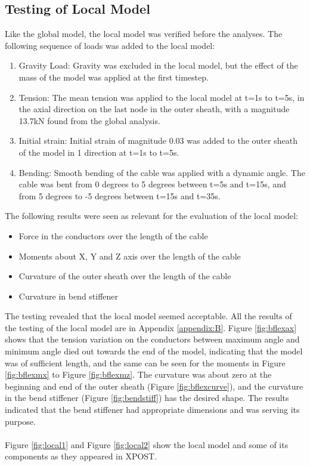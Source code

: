 \subsection{Testing of Local Model}
\label{sec:localtest}
Like the global model, the local model was verified before the analyses. The following sequence of loads was added to the local model:
\begin{enumerate}
    \item Gravity Load: Gravity was excluded in the local model, but the effect of the mass of the model was applied at the first timestep. 
    \item Tension: The mean tension was applied to the local model at t=1s to t=5s, in the axial direction on the last node in the outer sheath, with a magnitude 13.7kN found from the global analysis.
    \item Initial strain: Initial strain of magnitude 0.03 was added to the outer sheath of the model in 1 direction at t=1s to t=5s.
    \item Bending: Smooth bending of the cable was applied with a dynamic angle. The cable was bent from 0 degrees to 5 degrees between t=5s and t=15s, and from 5 degrees to -5 degrees between t=15s and t=35s.  
\end{enumerate}
The following results were seen as relevant for the evaluation of the local model:
\begin{itemize}
    \item Force in the conductors over the length of the cable
    \item Moments about X, Y and Z axis over the length of the cable
    \item Curvature of the outer sheath over the length of the cable
    \item Curvature in bend stiffener
\end{itemize}
The testing revealed that the local model seemed acceptable. All the results of the testing of the local model are in Appendix \ref{appendix:B}. Figure \ref{fig:bflexax} shows that the tension variation on the conductors between maximum angle and minimum angle died out towards the end of the model, indicating that the model was of sufficient length, and the same can be seen for the moments in Figure \ref{fig:bflexmx} to Figure \ref{fig:bflexmz}. The curvature was about zero at the beginning and end of the outer sheath (Figure \ref{fig:bflexcurve}), and the curvature in the bend stiffener (Figure \ref{fig:bendstiff}) has the desired shape. The results indicated that the bend stiffener had appropriate dimensions and was serving its purpose. \\\\
Figure \ref{fig:local1} and Figure \ref{fig:local2} show the local model and some of its components as they appeared in XPOST.

